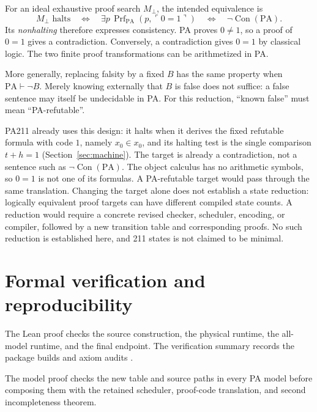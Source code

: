 \documentclass[11pt,letterpaper]{article}
\newcommand{\PA}{\mathrm{PA}}
\newcommand{\Con}{\operatorname{Con}}
\newcommand{\Prf}{\operatorname{Prf}}
\newcommand{\code}[1]{\ulcorner #1\urcorner}
\begin{document}
For an ideal exhaustive proof search $M_{\bot}$, the intended equivalence is
\[
M_{\bot}\text{ halts}
\quad\Longleftrightarrow\quad
\exists p\,\Prf_{\PA}(p,\code{0=1})
\quad\Longleftrightarrow\quad \neg\Con(\PA).
\]
Its \emph{nonhalting} therefore expresses consistency. PA proves
$0\ne1$, so a proof of $0=1$ gives a contradiction. Conversely, a
contradiction gives $0=1$ by classical logic. The two finite
proof transformations can be arithmetized in PA.

More generally, replacing falsity by a fixed $B$ has the same property
when $\PA\vdash\neg B$. Merely knowing externally that $B$ is false
does not suffice: a false sentence may itself be undecidable in PA.
For this reduction, ``known false'' must mean ``PA-refutable''.

PA211 already uses this design: it halts when it derives the fixed
refutable formula with code $1$, namely $x_0\in x_0$, and its halting test is
the single comparison $t+h=1$ (Section~\ref{sec:machine}). The target is
already a contradiction, not a sentence such as $\neg\Con(\PA)$. The
object calculus has no arithmetic symbols, so $0=1$ is not one of its
formulas. A PA-refutable target would pass through the same translation.
Changing the target alone does not establish a state reduction: logically
equivalent proof targets can have different compiled state counts. A reduction
would require a concrete revised checker, scheduler, encoding, or
compiler, followed by a new transition table and corresponding proofs.
No such reduction is established here, and 211 states is not claimed to
be minimal.

\section{Formal verification and reproducibility}\label{sec:checked}

The Lean proof checks the source construction, the physical runtime,
the all-model runtime, and the final endpoint. The verification summary
records the package builds and axiom audits \cite{verification}.

The model proof checks the new table and source paths in every PA model
before composing them with the retained scheduler, proof-code translation,
and second incompleteness theorem.
\end{document}
